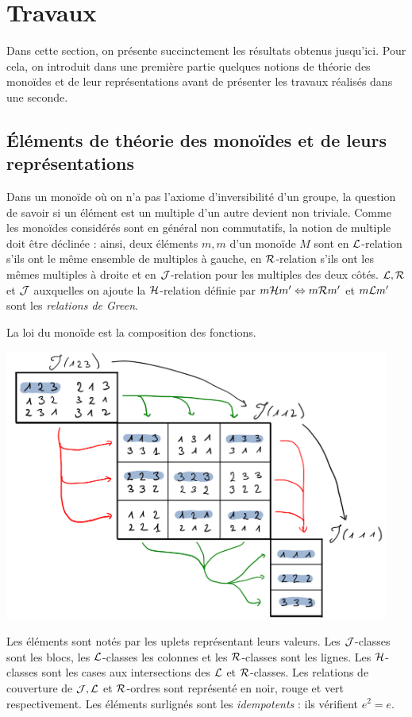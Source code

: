 \documentclass{article}
\begin{document}
	\section*{Travaux}\label{sec:travaux}
	
	Dans cette section, on présente succinctement les résultats obtenus jusqu'ici. Pour cela, on introduit dans une première partie quelques notions de théorie des monoïdes et de leur représentations avant de présenter les travaux réalisés dans une seconde.
	
	\subsection*{\'Eléments de théorie des monoïdes et de leurs représentations}
	
	Dans un monoïde où on n'a pas l'axiome d'inversibilité d'un groupe, la question de savoir si un élément est un multiple d'un autre devient non triviale. Comme les monoïdes considérés sont en général non commutatifs, la notion de multiple doit être déclinée : ainsi, deux éléments $m, m$ d'un monoïde $M$ sont en $\mathcal{L}$-relation s'ils ont le même ensemble de multiples à gauche, en $\mathcal{R}$-relation s'ils ont les mêmes multiples à droite et en $\mathcal{J}$-relation pour les multiples des deux côtés. $\mathcal{L}, \mathcal{R}$ et $\mathcal{J}$  auxquelles on ajoute la $\mathcal{H}$-relation définie par $m\mathcal{H} m' \Leftrightarrow m\mathcal{R} m'$ et $m\mathcal{L} m'$ sont les \emph{relations de Green}.
	
	\begin{lined}
		\begin{ex}
			La loi du monoïde est la composition des fonctions.
		
			{\centering
			\includegraphics[width=0.95\textwidth]{./ordres.png}}
			
			Les éléments sont notés par les uplets représentant leurs valeurs. Les $\mathcal{J}$-classes sont les blocs, les $\mathcal{L}$-classes les colonnes et les $\mathcal{R}$-classes sont les lignes. Les $\mathcal{H}$-classes sont les cases aux intersections des $\mathcal{L}$ et $\mathcal{R}$-classes. Les relations de couverture de $\mathcal{J}, \mathcal{L}$ et $\mathcal{R}$-ordres sont représenté en noir, rouge et vert respectivement. Les éléments surlignés sont les \emph{idempotents} : ils vérifient $e^2 = e$.
		\end{ex}
	\end{lined}
	
\end{document}
